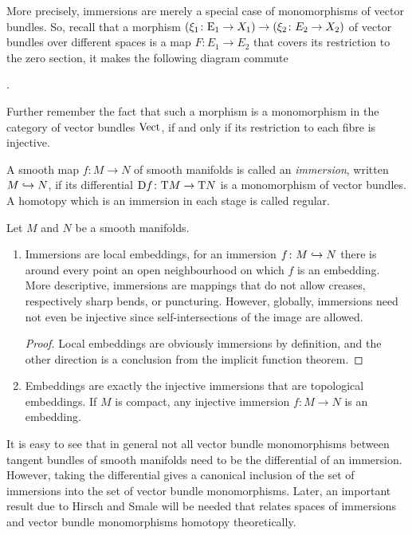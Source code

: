 More precisely, immersions are merely a special case of monomorphisms
of vector bundles. So, recall that a morphism
$(\xi_1\colon\mathrm{E}_1\to X_1)\to(\xi_2\colon E_2\to X_2)$ 
of vector bundles over different spaces is a map $F\colon E_1\to E_2$
that covers its restriction to the zero section, \idest it makes the
following diagram commute
\begin{center}
  .
\end{center}
Further remember the fact that such a morphism is a monomorphism in
the category of vector bundles $\mathrm{Vect}$, if and only if its restriction
to each fibre is injective.
\begin{Def}
  A smooth map $f\colon M\to N$ of smooth manifolds is called
  an \emph{immersion}, written $M\hookrightarrow N$, if its differential
  $\mathrm{D} f\colon\mathrm{T}M\to\mathrm{T}N$ is a monomorphism of vector
  bundles.
  A homotopy which is an immersion in each stage is called regular.
\end{Def}
\begin{Rem}
  Let $M$ and $N$ be a smooth manifolds.
  \begin{enumerate}
  \item
    Immersions are local embeddings, \idest for an immersion
    $f\colon M\hookrightarrow N$ there is around every point an open neighbourhood
    on which $f$ is an embedding.
    More descriptive, immersions are mappings that do not allow creases,
    respectively sharp bends, or puncturing.
    However, globally, immersions need not even be injective since
    \forexample self-intersections of the image are allowed.
    \begin{proof}
      Local embeddings are obviously immersions by definition, and the
      other direction is a conclusion from the implicit function theorem.
    \end{proof}
  \item Embeddings are exactly the injective immersions that are
    topological embeddings.
    If $M$ is compact, any injective immersion $f\colon M\to N$ is an
    embedding.
  \end{enumerate}
\end{Rem}
It is easy to see that in general not all vector bundle monomorphisms
between tangent bundles of smooth manifolds need to be the
differential of an immersion. However, taking the differential gives a
canonical inclusion of the set of immersions into the set of vector
bundle monomorphisms.
Later, an important result due to Hirsch and Smale will be needed that
relates spaces of immersions and vector bundle monomorphisms homotopy
theoretically.

